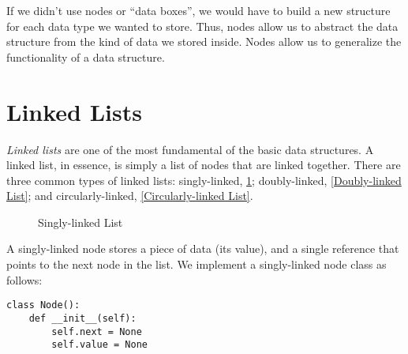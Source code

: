 If we didn't use nodes or ``data boxes'', we would have to build a new structure for each data type we wanted to store.
Thus, nodes allow us to abstract the data structure from the kind of data we stored inside.
Nodes allow us to generalize the functionality of a data structure.

\section*{Linked Lists}
\emph{Linked lists} are one of the most fundamental of the basic data 
structures. A linked list, in essence, is simply a list of nodes that
are linked together. There are three common types of linked lists: 
singly-linked, \ref{Singly-linked List}; doubly-linked, \ref{Doubly-linked List}; and circularly-linked, \ref{Circularly-linked List}.

\begin{figure}[!h]
\centering
{}
\caption{Singly-linked List}
\label{Singly-linked List}
\end{figure}

A singly-linked node stores a piece of data (its value), and a single reference that points to the next node in the list. We implement a singly-linked node class as follows:

\begin{lstlisting}
class Node():
    def __init__(self):
        self.next = None
        self.value = None
\end{lstlisting}

